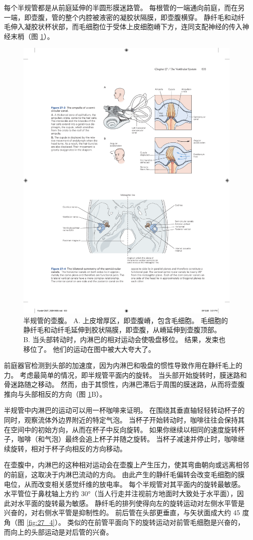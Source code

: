 每个半规管都是从前庭延伸的半圆形膜迷路管。 每根管的一端通向前庭，而在另一端，即壶腹，管的整个内腔被液密的凝胶状隔膜，即壶腹横穿。 
静纤毛和动纤毛伸入凝胶状杯状部，而毛细胞位于受体上皮细胞嵴下方，连同支配神经的传入神经末梢（图 \ref{fig:27_3}）。

\begin{figure}[htbp]
	\centering
	\includegraphics[width=0.7\linewidth]{chap27/fig_27_3}
	\caption{半规管的壶腹。 A. 上皮增厚区，即壶腹嵴，包含毛细胞。 毛细胞的静纤毛和动纤毛延伸到胶状隔膜，即壶腹，从嵴延伸到壶腹顶部。 B. 当头部转动时，内淋巴的相对运动会使吸盘移位。 结果，发束也移位了。 他们的运动在图中被大大夸大了。}
	\label{fig:27_3}
\end{figure}

前庭器官检测到头部的加速度，因为内淋巴和吸盘的惯性导致作用在静纤毛上的力。 考虑最简单的情况，即半规管平面内的旋转。 当头部开始旋转时，膜迷路和骨迷路随之移动。 然而，由于其惯性，内淋巴滞后于周围的膜迷路，从而将壶腹推向与头部相反的方向（图 \ref{fig:27_3}B）。

半规管中内淋巴的运动可以用一杯咖啡来证明。 在围绕其垂直轴轻轻转动杯子的同时，观察流体外边界附近的特定气泡。 当杯子开始转动时，咖啡往往会保持其在空间中的初始方向，从而在杯子中反向旋转。 如果你继续以相同的速度旋转杯子，咖啡（和气泡）最终会追上杯子并随之旋转。 当杯子减速并停止时，咖啡继续旋转，相对于杯子向相反的方向移动。

在壶腹中，内淋巴的这种相对运动会在壶腹上产生压力，使其弯曲朝向或远离相邻的前庭，这取决于内淋巴流动的方向。 由此产生的静纤毛偏转会改变毛细胞的膜电位，从而改变相关感觉纤维的放电率。 每个半规管对其平面内的旋转最敏感。 水平管位于鼻枕轴上方约 30°（当人行走并注视前方地面时大致处于水平面），因此对水平面的旋转最为敏感。 静纤毛的排列使得向左的旋转运动对左侧水平管是兴奋的，对右侧水平管是抑制性的。 
前后管在头部更垂直，与矢状面成大约 45 度角（图 \ref{fig:27_4}）。 
类似的在前管平面向下的旋转运动对前管毛细胞是兴奋的，而向上的头部运动是对后管的兴奋。

